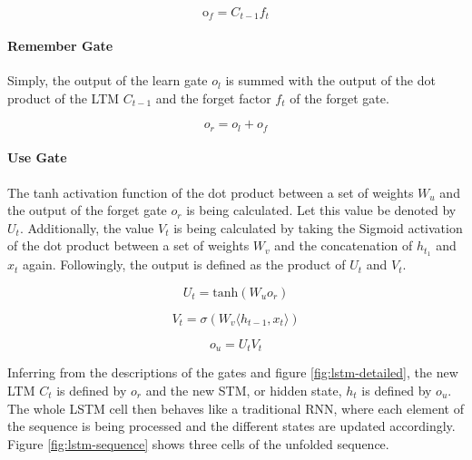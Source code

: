 \documentclass[11pt]{scrartcl}
\begin{document}
\begin{equation}
	\text{o}_{f} = C_{t-1} f_t
\end{equation}

\paragraph*{\textcolor{viridis5}{\textbf{Remember Gate}}}
Simply, the output of the learn gate $o_l$ is summed with the output of the dot product of the LTM $C_{t-1}$ and the forget factor $f_t$ of the forget gate.

\begin{equation}
	o_r = o_l + o_f
\end{equation}

\paragraph*{\textcolor{viridis7}{\textbf{Use Gate}}}
The tanh activation function of the dot product between a set of weights $W_u$ and the output of the forget gate $o_r$ is being calculated. Let this value be denoted by $U_t$. Additionally, the value $V_t$ is being calculated by taking the Sigmoid activation of the dot product between a set of weights $W_v$ and the concatenation of $h_{t_1}$ and $x_t$ again. Followingly, the output is defined as the product of $U_t$ and $V_t$.

\begin{equation}
	U_t = \text{tanh}(W_u o_r)
\end{equation}

\begin{equation}
	V_t = \sigma(W_v \langle h_{t-1},x_t\rangle)
\end{equation}

\begin{equation}
	o_u = U_t V_t
\end{equation}

Inferring from the descriptions of the gates and figure \ref{fig:lstm-detailed}, the new LTM $C_t$ is defined by $o_r$ and the new STM, or hidden state, $h_t$ is defined by $o_u$. The whole LSTM cell then behaves like a traditional RNN, where each element of the sequence is being processed and the different states are updated accordingly. Figure \ref{fig:lstm-sequence} shows three cells of the unfolded sequence.
\end{document}
